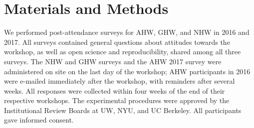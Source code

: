 \documentclass{aastex62}
\begin{document}

\newpage

\tableofcontents



\section{Materials and Methods}
\label{sec:suppmaterials}
We performed post-attendance surveys for AHW, GHW, and NHW in 2016 and 2017. All surveys contained general questions about attitudes towards the workshop, as well as open science and reproducibility, shared among all three surveys. The NHW and GHW surveys and the AHW 2017 survey were administered on site on the last day of the workshop; AHW participants in 2016 were e-mailed immediately after the workshop, with reminders after several weeks. All responses were collected within four weeks of the end of their respective workshops. The experimental procedures were approved by the Institutional Review Boards at UW, NYU, and UC Berkeley. All participants gave informed consent.
\end{document}
